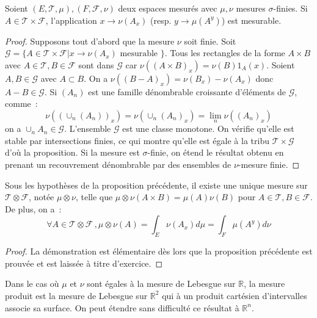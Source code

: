 \begin{prop}
Soient $(E, \mathcal{T}, \mu), (F, \mathcal{F}, \nu)$ deux espaces
mesurés avec $\mu,\nu$ mesures $\sigma$-finies. 
Si $A \in \mathcal{T} \times \mathcal{F}$, l'application $x
\to \nu(A_x)$ (resp. $y \to \mu(A^y)$) est mesurable.
\end{prop}
\begin{proof}
Supposons tout d'abord que la mesure $\nu$ soit finie. Soit
$\mathcal{G} = \{ A \in \mathcal{T} \times \mathcal{F} | x \to
\nu(A_x) \mbox { mesurable } \}$. Tous les rectangles de la forme  $A
\times B$ avec $A\in \mathcal{T}, B \in \mathcal{F}$ sont dans
$\mathcal{G}$ car $\nu((A \times B)_x) = \nu(B) 1_A(x)$. Soient $A,B
\in \mathcal{G}$ avec $A \subset B$. On a $\nu((B-A)_x) = \nu(B_x) -
\nu(A_x)$ donc $A - B \in \mathcal{G}$. Si $(A_n)$ est une famille
dénombrable croissante d'éléments de $\mathcal{G}$, comme~:
\[
\nu((\cup_n(A_n))_x) = \nu(\cup_n (A_n)_x) = \lim_n \nu((A_n)_x)
\]
on a $\cup_n A_n \in \mathcal{G}$. L'ensemble $\mathcal{G}$ est une
classe monotone. On vérifie qu'elle est stable par intersections
finies, ce qui montre qu'elle est égale à la tribu $\mathcal{T} \times
\mathcal{G}$ d'où la proposition. 
Si la mesure est $\sigma$-finie, on étend le résultat obtenu en
prenant un recouvrement dénombrable par des ensembles de $\nu$-mesure finie.
\end{proof}
\begin{mandatory}
\begin{theorem}
Sous les hypothèses de la proposition précédente, il existe une unique
mesure sur $\mathcal{T} \otimes \mathcal{F}$, notée $\mu \otimes \nu$,
telle que $\mu\otimes \nu (A \times B) = \mu(A) \nu(B)$ pour $A \in
\mathcal{T}, B \in \mathcal{F}$. De plus, on a~:
\[
\forall A \in \mathcal{T} \otimes \mathcal{F} \, , \mu \otimes \nu (A) = \int_E
\nu(A_x) d \mu = \int_F \mu(A^y) d \nu
\]
\end{theorem}
\end{mandatory}
\begin{proof}
La démonstration est élémentaire dès lors que la proposition
précédente est prouvée et est laissée à titre d'exercice.
\end{proof}
Dans le cas où $\mu$ et $\nu$ sont égales à la mesure de Lebesgue sur
$\mathbb{R}$, la mesure produit est la mesure de Lebesgue sur $\mathbb{R}^2$ qui
à un produit cartésien d'intervalles associe sa surface. On peut étendre sans
difficulté ce résultat à $\mathbb{R}^n$.
